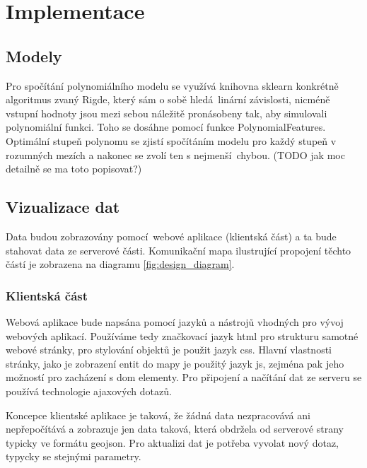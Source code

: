 
\chapter{Implementace}






\section{Modely}


Pro spočítání polynomiálního modelu se využívá knihovna sklearn konkrétně algoritmus zvaný Rigde, který sám o sobě hledá linární závislosti, nicméně vstupní hodnoty jsou mezi sebou náležitě pronásobeny tak, aby simulovali polynomiální funkci. Toho se dosáhne pomocí funkce PolynomialFeatures. Optimální stupeň polynomu se zjistí spočítáním modelu pro každý stupeň v rozumných mezích a nakonec se zvolí ten s nejmenší chybou. (TODO jak moc detailně se ma toto popisovat?)






\section{Vizualizace dat}

Data budou zobrazovány pomocí webové aplikace (klientská část) a ta bude stahovat data ze serverové části. Komunikační mapa ilustrující propojení těchto částí je zobrazena na diagramu \ref{fig:design_diagram}.

\subsection{Klientská část}

Webová aplikace bude napsána pomocí jazyků a nástrojů vhodných pro vývoj webových aplikací. Používáme tedy značkovací jazyk \gls{html} pro strukturu samotné webové stránky, pro stylování objektů je použit jazyk \gls{css}. Hlavní vlastnosti stránky, jako je zobrazení entit do mapy je použitý jazyk \gls{js}, zejména pak jeho možností pro zacházení s \gls{dom} elementy. Pro připojení a načítání dat ze serveru se používá technologie \gls{ajax}ových dotazů.

\bigbreak

Koncepce klientské aplikace je taková, že žádná data nezpracovává ani nepřepočítává a zobrazuje jen data taková, která obdržela od serverové strany typicky ve formátu \gls{geojson}. Pro aktualizi dat je potřeba vyvolat nový dotaz, typycky se stejnými parametry.

